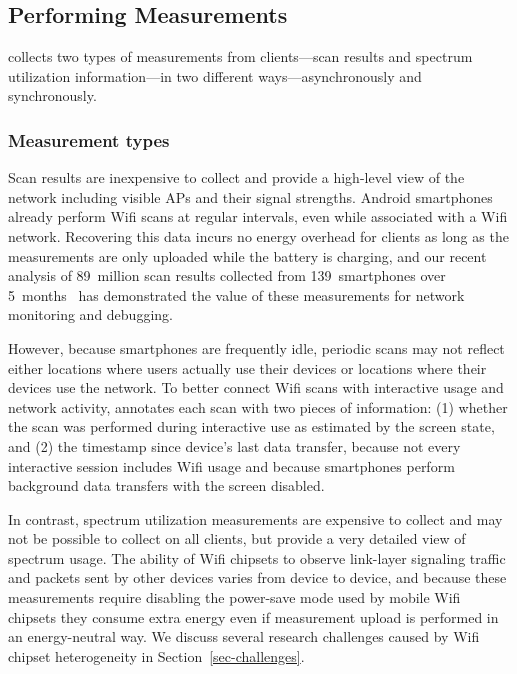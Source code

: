 \subsection{Performing Measurements}
\label{subsec-measurement}

\PS{} collects two types of measurements from clients---scan results and
spectrum utilization information---in two different ways---asynchronously and
synchronously.

\subsubsection{Measurement types}

Scan results are inexpensive to collect and provide a high-level view of the
network including visible APs and their signal strengths. Android smartphones
already perform Wifi scans at regular intervals, even while associated with a
Wifi network. Recovering this data incurs no energy overhead for clients as
long as the measurements are only uploaded while the battery is charging, and
our recent analysis of 89~million scan results collected from 139~smartphones
over 5~months~\cite{conext14-pocketsniffer} has demonstrated the value of
these measurements for network monitoring and debugging.

However, because smartphones are frequently idle, periodic scans may not
reflect either locations where users actually use their devices or locations
where their devices use the network. To better connect Wifi scans with
interactive usage and network activity, \PS{} annotates each scan with two
pieces of information: (1) whether the scan was performed during interactive
use as estimated by the screen state, and (2) the timestamp since device's last
data transfer, because not every interactive session includes Wifi usage and
because smartphones perform background data transfers with the screen
disabled.

In contrast, spectrum utilization measurements are expensive to collect and
may not be possible to collect on all clients, but provide a very detailed
view of spectrum usage. The ability of Wifi chipsets to observe link-layer
signaling traffic and packets sent by other devices varies from device to
device, and because these measurements require disabling the power-save mode
used by mobile Wifi chipsets they consume extra energy even if measurement
upload is performed in an energy-neutral way. We discuss several research
challenges caused by Wifi chipset heterogeneity in
Section~\ref{sec-challenges}.

